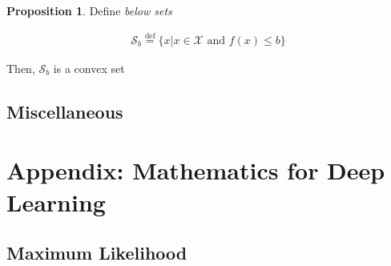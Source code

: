 \documentclass[a4paper,12pt]{article}
\theoremstyle{definition}
\newtheorem*{proposition}{Proposition}
\begin{document}
\begin{proposition}
    Define \emph{below sets}

    \begin{align*}
        \mathcal{S}_b \stackrel{\mathrm{def}}{=} \{x | x \in \mathcal{X} \text{ and } f(x) \leq b\}
    \end{align*}


    Then,
    $\mathcal{S}_b$ is a convex set
\end{proposition}

\newpage
\subsection*{Miscellaneous}


\section{Appendix: Mathematics for Deep Learning}
\subsection{Maximum Likelihood}
\end{document}
